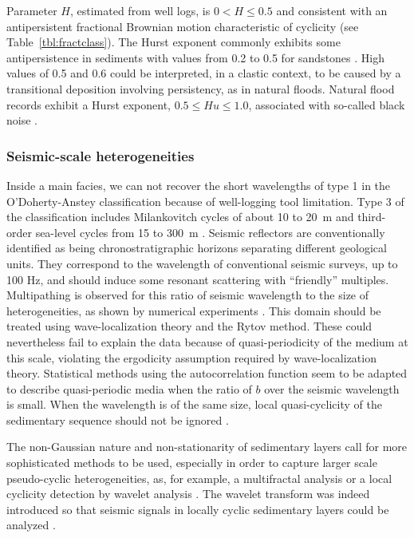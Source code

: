 Parameter $H$, estimated from well logs, is $0< H\leq0.5$ and 
consistent with an antipersistent fractional Brownian motion characteristic of cyclicity (see Table~\ref{tbl:fractclass}).
The Hurst exponent commonly exhibits some antipersistence  in sediments with values from 0.2
to 0.5 for sandstones \cite[]{Dolan_BR98,Lu_MFC02}.
High values of 0.5 and 0.6 could be interpreted, in a clastic context,
to be caused by a transitional deposition involving persistency, as in natural floods.
Natural flood records exhibit a Hurst exponent, $0.5\leq Hu \leq 1.0$, associated 
with so-called black noise \cite[]{Hurst_51,Mandelbrot_W69}.


\subsubsection{Seismic-scale heterogeneities}


Inside a main facies, we can not recover the short wavelengths of type 1 in the O'Doherty-Anstey 
classification because of well-logging tool limitation.
Type 3 of the classification includes
Milankovitch cycles of about 10 to 20~m
and third-order sea-level cycles from 15 to 300~m \cite[]{Anstey_D02a}.
Seismic reflectors are conventionally identified 
as being chronostratigraphic horizons separating different geological 
units. They correspond to the wavelength of conventional seismic surveys,
up to 100 Hz, and should induce some resonant scattering with ``friendly'' multiples.
Multipathing is observed for this ratio
of seismic wavelength to the size of heterogeneities,
as shown by numerical experiments \cite[]{Frankel_C86}.
This domain should be treated using wave-localization theory and the Rytov method.
These could nevertheless fail to explain the data because 
of quasi-periodicity of the medium at this scale, violating the ergodicity assumption required 
by wave-localization theory. 
Statistical methods using the autocorrelation function seem to be adapted 
to describe quasi-periodic media when the ratio of $b$ over the seismic wavelength is small.
When the wavelength is of the same size, local quasi-cyclicity of the sedimentary sequence should not be ignored \cite[]{Morlet_AFG82,Stovas_U07}.

The non-Gaussian nature and non-stationarity of sedimentary layers
call for more sophisticated methods to be used, especially in order to capture larger scale pseudo-cyclic heterogeneities, 
as, for example, a multifractal analysis \cite[]{Marsan_B03} or a local cyclicity detection by wavelet analysis \cite[]{Rivera_RJCA04}.
The wavelet transform was indeed introduced so that seismic signals in locally cyclic sedimentary layers could be analyzed \cite[]{Morlet_AFG82}.


